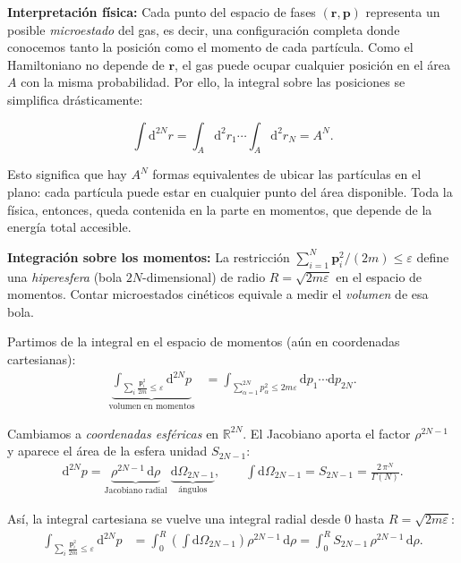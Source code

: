 \documentclass{article}
\begin{document}
\noindent
\textbf{Interpretación física:}  
Cada punto del espacio de fases \((\mathbf{r},\mathbf{p})\) representa un posible \emph{microestado} del gas, es decir, una configuración completa donde conocemos tanto la posición como el momento de cada partícula.  
Como el Hamiltoniano no depende de \(\mathbf{r}\), el gas puede ocupar cualquier posición en el área \(A\) con la misma probabilidad. Por ello, la integral sobre las posiciones se simplifica drásticamente:

\[
\int \mathrm d^{2N}r
=\int_A \mathrm d^2r_1\cdots\int_A \mathrm d^2r_N
= A^N.
\]

\noindent
Esto significa que hay \(A^N\) formas equivalentes de ubicar las partículas en el plano: cada partícula puede estar en cualquier punto del área disponible.  
Toda la física, entonces, queda contenida en la parte en momentos, que depende de la energía total accesible.

\vspace{1em}
\textbf{Integración sobre los momentos:}
La restricción \(\sum_{i=1}^{N}\mathbf p_i^{2}/(2m)\le \varepsilon\) define una \emph{hiperesfera} (bola \(2N\)-dimensional) de radio \(R=\sqrt{2m\varepsilon}\) en el espacio de momentos. Contar microestados cinéticos equivale a medir el \emph{volumen} de esa bola.

\medskip
Partimos de la integral en el espacio de momentos (aún en coordenadas cartesianas):
\begin{equation*}
\begin{split}
\underbrace{\int_{\sum_{i}\frac{\mathbf p_i^{2}}{2m}\le \varepsilon}\!\!\mathrm d^{2N}p}_{\text{volumen en momentos}}
&=\int_{\sum_{\alpha=1}^{2N}p_\alpha^{2}\le 2m\varepsilon}\!\!\mathrm d p_1\cdots \mathrm d p_{2N}.
\end{split}
\end{equation*}

Cambiamos a \emph{coordenadas esféricas} en \(\mathbb R^{2N}\). El Jacobiano aporta el factor \(\rho^{2N-1}\) y aparece el área de la esfera unidad \(S_{2N-1}\):
\begin{equation*}
\begin{split}
\mathrm d^{2N}p
=\underbrace{\rho^{2N-1}\,\mathrm d\rho}_{\text{Jacobiano radial}}
\;\underbrace{\mathrm d\Omega_{2N-1}}_{\text{ángulos}},
\qquad
\int \mathrm d\Omega_{2N-1}=S_{2N-1}
=\frac{2\,\pi^{N}}{\Gamma(N)}.
\end{split}
\end{equation*}

Así, la integral cartesiana se vuelve una integral radial desde \(0\) hasta \(R=\sqrt{2m\varepsilon}\):
\begin{equation*}
\begin{split}
\int_{\sum_{i}\frac{\mathbf p_i^{2}}{2m}\le \varepsilon}\!\!\mathrm d^{2N}p
&=\int_{0}^{R}\!\!\left(\int \mathrm d\Omega_{2N-1}\right)\rho^{2N-1}\,\mathrm d\rho
=\int_{0}^{R}\! S_{2N-1}\,\rho^{2N-1}\,\mathrm d\rho.
\end{split}
\end{equation*}
\end{document}
